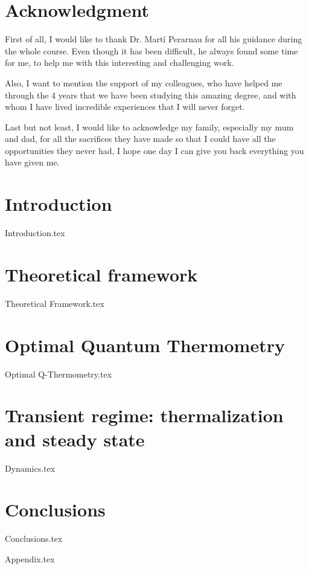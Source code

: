 \documentclass[a4paper,11pt,twoside]{report}
\begin{document}
\clearpage
\thispagestyle{empty}
\hfill
\clearpage
\newpage
\thispagestyle{empty}
\chapter*{Acknowledgment}
First of all, I would like to thank Dr. Martí Perarnau for all his guidance  during the whole course. Even though it has been difficult, he always found some time for me, to help me with this interesting and challenging work.  

Also, I want to mention the support of my colleagues, who have helped me through the 4 years that we have been studying this amazing degree, and with whom I have lived incredible experiences that I will never forget.

Last but not least, I would like to acknowledge my family, especially my mum and dad, for all the sacrifices they have made so that I could have all the opportunities they never had, I hope one day I can give you back everything you have given me.
\clearpage
\thispagestyle{empty}
\hfill
\clearpage
\newpage
\thispagestyle{empty}
\tableofcontents

\newpage

\chapter{Introduction}\label{Chapter 1}
{Introduction.tex}

\newpage

\chapter{Theoretical framework}\label{Chapter 2}
{Theoretical Framework.tex}

\chapter{Optimal Quantum Thermometry}\label{Chapter 3}
{Optimal Q-Thermometry.tex}

\chapter{Transient regime: thermalization and steady state}\label{Chapter 4}
{Dynamics.tex}

\chapter{Conclusions}\label{Chapter 5}
{Conclusions.tex}

\newpage

\appendix
{Appendix.tex}

\newpage
{} %
\nocite{*}
\renewcommand{\bibname}{References}
\printbibliography
\end{document}
